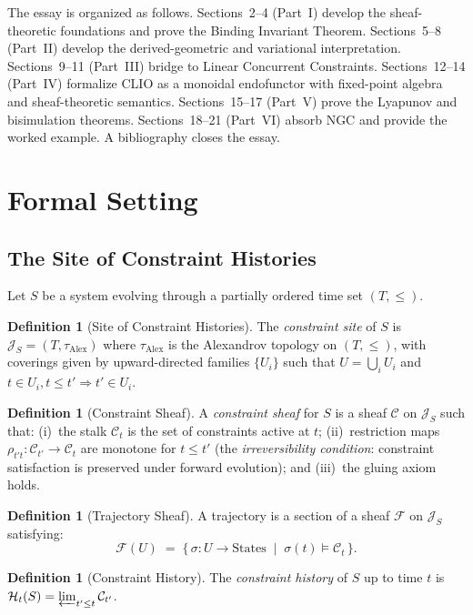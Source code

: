 \documentclass[11pt, letterpaper]{article}
\theoremstyle{plain}
\theoremstyle{definition}
\newtheorem{definition}[theorem]{Definition}
\theoremstyle{remark}
\newcommand{\CC}{\mathcal{C}}
\newcommand{\HH}{\mathcal{H}}
\newcommand{\FF}{\mathcal{F}}
\begin{document}
The essay is organized as follows. Sections~2--4 (Part~I) develop the sheaf-theoretic
foundations and prove the Binding Invariant Theorem. Sections~5--8 (Part~II) develop
the derived-geometric and variational interpretation. Sections~9--11 (Part~III) bridge
to Linear Concurrent Constraints. Sections~12--14 (Part~IV) formalize CLIO as a
monoidal endofunctor with fixed-point algebra and sheaf-theoretic semantics.
Sections~15--17 (Part~V) prove the Lyapunov and bisimulation theorems. Sections~18--21
(Part~VI) absorb NGC and provide the worked example. A bibliography closes the essay.

\section{Formal Setting}

\subsection{The Site of Constraint Histories}

Let $S$ be a system evolving through a partially ordered time set $(T, \leq)$.

\begin{definition}[Site of Constraint Histories]
The \emph{constraint site} of $S$ is $\mathcal{J}_S = (T, \tau_{\mathrm{Alex}})$
where $\tau_{\mathrm{Alex}}$ is the Alexandrov topology on $(T, \leq)$, with coverings
given by upward-directed families $\{U_i\}$ such that $U = \bigcup_i U_i$ and
$t \in U_i, t \leq t' \Rightarrow t' \in U_i$.
\end{definition}

\begin{definition}[Constraint Sheaf]
A \emph{constraint sheaf} for $S$ is a sheaf $\CC$ on $\mathcal{J}_S$ such that:
(i)~the stalk $\CC_t$ is the set of constraints active at $t$; (ii)~restriction maps
$\rho_{t't}: \CC_{t'} \to \CC_t$ are monotone for $t \leq t'$ (the
\emph{irreversibility condition}: constraint satisfaction is preserved under forward
evolution); and (iii)~the gluing axiom holds.
\end{definition}

\begin{definition}[Trajectory Sheaf]
A trajectory is a section of a sheaf $\FF$ on $\mathcal{J}_S$ satisfying:
\[
  \FF(U) \;=\; \bigl\{\, \sigma : U \to \mathrm{States} \;\mid\; \sigma(t) \models \CC_t\,\bigr\}.
\]
\end{definition}

\begin{definition}[Constraint History]
The \emph{constraint history} of $S$ up to time $t$ is
$\HH_t(S) = \varprojlim_{t' \leq t} \CC_{t'}$.
\end{definition}
\end{document}
